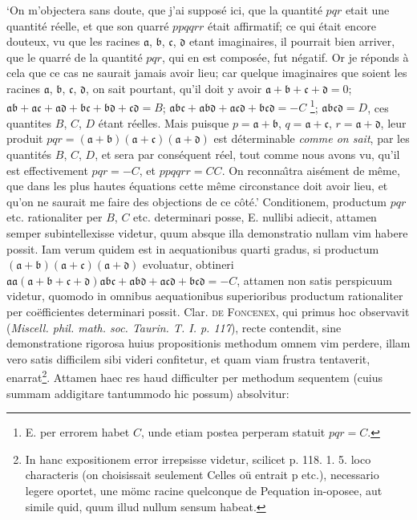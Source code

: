 \documentclass[twoside,12pt, showframe]{memoir}
\begin{document}
`On m'objectera sans doute, que j'ai suppos\'e ici, que la quantit\'e \(pqr\) etait une quantit\'e r\'eelle, et que son quarr\'e \(ppqqrr\) \'etait affirmatif; ce qui \'etait encore douteux, vu que les racines \(\mathfrak{a}\), \(\mathfrak{b}\), \(\mathfrak{c}\), \(\mathfrak{d}\) etant imaginaires, il pourrait bien arriver, que le quarr\'e de la quantit\'e \(pqr\), qui en est compos\'ee, fut n\'egatif. Or je r\'eponds \`a cela que ce cas ne saurait jamais avoir lieu; car quelque imaginaires que soient les racines \(\mathfrak{a}\), \(\mathfrak{b}\), \(\mathfrak{c}\), \(\mathfrak{d}\), on sait pourtant, qu'il doit y avoir \(\mathfrak{a} + \mathfrak{b} + \mathfrak{c} + \mathfrak{d} = 0 \); \(\mathfrak{a}\mathfrak{b} + \mathfrak{a}\mathfrak{c} + \mathfrak{a}\mathfrak{d} + \mathfrak{b}\mathfrak{c} + \mathfrak{b}\mathfrak{d} + \mathfrak{c}\mathfrak{d} = B\); \(\mathfrak{a}\mathfrak{b}\mathfrak{c}+\mathfrak{a}\mathfrak{b}\mathfrak{d}+\mathfrak{a}\mathfrak{c}\mathfrak{d}+\mathfrak{b}\mathfrak{c}\mathfrak{d} = -C\) \footnote{\textsc{E.} per errorem habet \(C\), unde etiam postea perperam statuit \(pqr = C\).}; \(\mathfrak{a}\mathfrak{b}\mathfrak{c}\mathfrak{d}=D\), ces quantites \(B\), \(C\), \(D\) \'etant r\'eelles. Mais puisque \(p = \mathfrak{a} + \mathfrak{b}\), \(q =\mathfrak{a} + \mathfrak{c}\), \(r = \mathfrak{a} + \mathfrak{d}\), leur produit \(pqr = (\mathfrak{a} + \mathfrak{b})(\mathfrak{a} + \mathfrak{c})(\mathfrak{a} + \mathfrak{d})\) est d\'eterminable \textit{comme on sait}, par les quantit\'es \(B\), \(C\), \(D\), et sera par cons\'equent r\'eel, tout comme nous avons vu, qu'il est effectivement \(pqr = -C\), et \(ppqqrr = CC\). On reconna\^{\i}tra ais\'ement de m\^eme, que dans les plus hautes \'equations cette m\^eme circonstance doit avoir lieu, et qu'on ne saurait me faire des objections de ce c\^ot\'e.'  Conditionem, productum \(pqr\) etc{.} rationaliter per \(B\), \(C\) etc{.} determinari posse, \textsc{E.} nullibi adiecit, attamen semper subintellexisse videtur, quum absque illa demonstratio nullam vim habere possit.  Iam verum quidem est in aequationibus quarti gradus, si productum \( (\mathfrak{a} + \mathfrak{b})(\mathfrak{a} + \mathfrak{c})(\mathfrak{a} + \mathfrak{d})\) evoluatur, obtineri \( \mathfrak{a}\mathfrak{a}(\mathfrak{a} + \mathfrak{b} + \mathfrak{c} + \mathfrak{d}) \mathfrak{a}\mathfrak{b}\mathfrak{c}+\mathfrak{a}\mathfrak{b}\mathfrak{d}+\mathfrak{a}\mathfrak{c}\mathfrak{d}+\mathfrak{b}\mathfrak{c}\mathfrak{d}= - C\), attamen non satis perspicuum videtur, quomodo in omnibus aequationibus superioribus productum rationaliter per co\"efficientes determinari possit. Clar. \textsc{de Foncenex}, qui primus hoc observavit (\textit{Miscell. phil. math. soc. Taurin. T. I. p. 117}), recte contendit, sine demonstratione rigorosa huius propositionis methodum omnem vim perdere, illam vero satis difficilem sibi videri confitetur, et quam viam frustra tentaverit, enarrat\footnote{In hanc expositionem error irrepsisse videtur, scilicet p. 118. 1. 5. loco characteris (on choisissait seulement Celles oü entrait p etc{.}), necessario legere oportet, une mömc racine quelconque de Pequation in-oposee, aut simile quid, quum illud nullum sensum habeat.}. Attamen haec res haud difficulter per methodum sequentem (cuius summam addigitare tantummodo hic possum) absolvitur: 
\end{document}
